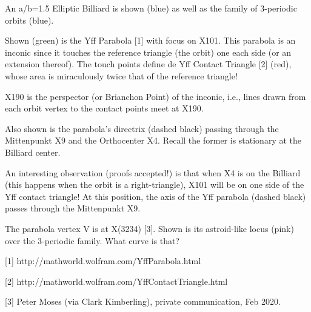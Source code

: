 An a/b=1.5 Elliptic Billiard is shown (blue) as well as the family of 3-periodic orbits (blue).

Shown (green) is the Yff Parabola [1] with focus on X101. This parabola is an inconic since it touches the reference triangle (the orbit) one each side (or an extension thereof). The touch points define de Yff Contact Triangle [2] (red), whose area is miraculously twice that of the reference triangle!

X190 is the perspector (or Brianchon Point) of the inconic, i.e., lines drawn from each orbit vertex to the contact points meet at X190.

Also shown is the parabola's directrix (dashed black) passing through the Mittenpunkt X9 and the Orthocenter X4. Recall the former is stationary at the Billiard center.

An interesting observation (proofs accepted!) is that when X4 is on the Billiard (this happens when the orbit is a right-triangle), X101 will be on one side of the Yff contact triangle! At this position, the axis of the Yff parabola (dashed black) passes through the Mittenpunkt X9.

The parabola vertex V is at X(3234) [3]. Shown is its astroid-like locus (pink) over the 3-periodic family. What curve is that?

[1] http://mathworld.wolfram.com/YffParabola.html

[2] http://mathworld.wolfram.com/YffContactTriangle.html

[3] Peter Moses (via Clark Kimberling), private communication, Feb 2020.